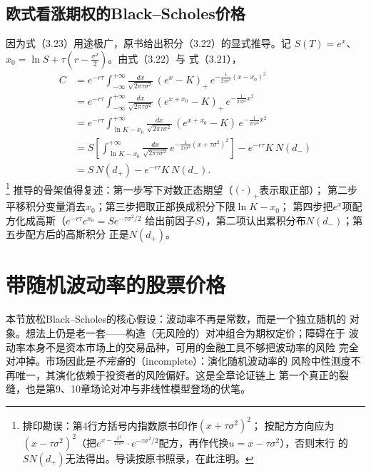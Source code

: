 \subsection*{欧式看涨期权的Black--Scholes价格}

因为式（3.23）用途极广，原书给出积分（3.22）的显式推导。记
$S(T)=e^{x}$、$x_0=\ln S+\tau(r-\frac{\sigma^{2}}{2})$。由式（3.22）与
式（3.21），
\begin{align*}
C&=e^{-r\tau}\int_{-\infty}^{+\infty}\frac{dx}{\sqrt{2\pi\tau\sigma^{2}}}
\,(e^{x}-K)_{+}\,e^{-\frac{1}{2\tau\sigma^{2}}(x-x_{0})^{2}}\\
&=e^{-r\tau}\int_{-\infty}^{+\infty}\frac{dx}{\sqrt{2\pi\tau\sigma^{2}}}
\,(e^{x+x_{0}}-K)_{+}\,e^{-\frac{1}{2\tau\sigma^{2}}x^{2}}\\
&=e^{-r\tau}\int_{\ln K-x_{0}}^{+\infty}\frac{dx}{\sqrt{2\pi\tau\sigma^{2}}}
\,(e^{x+x_{0}}-K)\,e^{-\frac{1}{2\tau\sigma^{2}}x^{2}}\\
&=S\left[\int_{\ln K-x_{0}}^{+\infty}\frac{dx}{\sqrt{2\pi\tau\sigma^{2}}}
\,e^{-\frac{1}{2\tau\sigma^{2}}(x+\tau\sigma^{2})^{2}}\right]
-e^{-r\tau}K\,N(d_{-})\\
&=S\,N(d_{+})-e^{-r\tau}K\,N(d_{-}).
\tag{3.25}
\end{align*}
\footnote{排印勘误：第4行方括号内指数原书印作$(x+\tau\sigma^{2})^{2}$；
按配方方向应为$(x-\tau\sigma^{2})^{2}$（把$e^{x-\frac{x^{2}}{2\tau\sigma^{2}}}
\cdot e^{-\tau\sigma^{2}/2}$配方，再作代换$u=x-\tau\sigma^{2}$），否则末行
的$SN(d_{+})$无法得出。导读按原书照录，在此注明。}
推导的骨架值得复述：第一步写下对数正态期望（$(\cdot)_{+}$表示取正部）；
第二步平移积分变量消去$x_0$；第三步把取正部换成积分下限$\ln K-x_0$；
第四步把$e^{x}$项配方化成高斯（$e^{-r\tau}e^{x_0}=Se^{-\tau\sigma^{2}/2}$
给出前因子$S$），第二项认出累积分布$N(d_-)$；第五步配方后的高斯积分
正是$N(d_+)$。

\section{带随机波动率的股票价格}

本节放松Black--Scholes的核心假设：波动率不再是常数，而是一个独立随机的
对象。想法上仍是老一套——构造（无风险的）对冲组合为期权定价；障碍在于
波动率本身不是资本市场上的交易品种，可用的金融工具不够把波动率的风险
完全对冲掉。市场因此是\emph{不完备}的（incomplete）：演化随机波动率的
风险中性测度不再唯一，其演化依赖于投资者的风险偏好。这是全章论证链上
第一个真正的裂缝，也是第9、10章场论对冲与非线性模型登场的伏笔。

